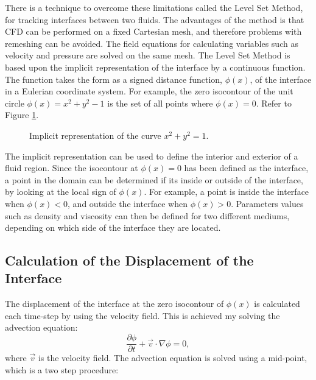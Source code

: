 There is a technique to overcome these limitations called the Level Set Method, for tracking interfaces between two fluids. The advantages of the method is that CFD can be performed on a fixed Cartesian mesh, and therefore problems with remeshing can be avoided. The field equations for calculating variables such as velocity and pressure are solved on the same mesh. The Level Set Method is based upon the implicit representation of the interface by a continuous function. The function takes the form as a signed distance function, $\phi(x)$, of the interface in a Eulerian coordinate system. For example, the zero isocontour of the unit circle $\phi(x)=x^2 + y^2 -1$ is the set of all points where $\phi(x)=0$. Refer to Figure \ref{UNITCIRCLE}.
%
\begin{figure}
\center
{}
\caption{Implicit representation of the curve $x^2 + y^2 = 1$.}
\label{UNITCIRCLE}
\end{figure}
%
The implicit representation can be used to define the interior and exterior of a fluid region. Since the isocontour at $\phi(x)=0$ has been defined as the interface, a point in the domain can be determined if its inside or outside of the interface, by looking at the local sign of $\phi(x)$. For example, a point is inside the interface when $\phi(x)<0$, and outside the interface when $\phi(x)>0$. Parameters values such as density and viscosity can then be defined for two different mediums, depending on which side of the interface they are located.


\subsection{Calculation of the Displacement of the Interface}

The displacement of the interface at the zero isocontour of $\phi(x)$ is calculated each time-step by using the velocity field. This is achieved my solving the advection equation:
%
\begin{equation}
\frac{\partial \phi}{\partial t} + \vec{v} \cdot \nabla \phi = 0,
\label{ADVECTION}
\end{equation}
%
where $\vec{v}$ is the velocity field. The advection equation is solved using a mid-point, which is a two step procedure:

